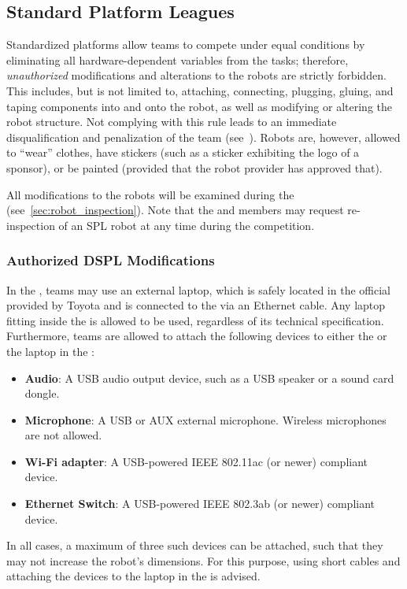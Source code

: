 \subsection{Standard Platform Leagues}

Standardized platforms allow teams to compete under equal conditions by eliminating all hardware-dependent variables from the tasks; therefore, \emph{unauthorized} modifications and alterations to the robots are strictly forbidden.
This includes, but is not limited to, attaching, connecting, plugging, gluing, and taping components into and onto the robot, as well as modifying or altering the robot structure.
Not complying with this rule leads to an immediate disqualification and penalization of the team (see~).
Robots are, however, allowed to \enquote{wear} clothes, have stickers (such as a sticker exhibiting the logo of a sponsor), or be painted (provided that the robot provider has approved that).

All modifications to the robots will be examined during the \RobotInspection{} (see~\ref{sec:robot_inspection}).
Note that the \EC{} and \TC{} members may request re-inspection of an SPL robot at any time during the competition.

\subsubsection{Authorized DSPL Modifications}\label{rule:osl_dspl}

In the \DSPL{}, teams may use an external laptop, which is safely located in the official \MountingBracket{} provided by Toyota and is connected to the \HSR{} via an Ethernet cable.
Any laptop fitting inside the \MountingBracket{} is allowed to be used, regardless of its technical specification.
Furthermore, teams are allowed to attach the following devices to either the \HSR{} or the laptop in the \MountingBracket:
\begin{itemize}
	\item \textbf{Audio}: A USB audio output device, such as a USB speaker or a sound card dongle.
	\item \textbf{Microphone}: A USB or AUX external microphone. Wireless microphones are not allowed.
	\item \textbf{Wi-Fi adapter}: A USB-powered IEEE 802.11ac (or newer) compliant device.
	\item \textbf{Ethernet Switch}: A USB-powered IEEE 802.3ab (or newer) compliant device.
\end{itemize}
In all cases, a maximum of three such devices can be attached, such that they may not increase the robot's dimensions.
For this purpose, using short cables and attaching the devices to the laptop in the \MountingBracket{} is advised.

